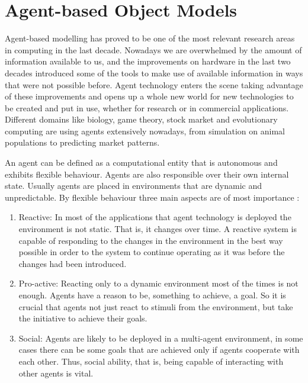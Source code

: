 \section{Agent-based Object Models}

Agent-based modelling has proved to be one of the most relevant research areas in computing in the last decade. Nowadays we are overwhelmed by the amount of information available to us, and the improvements on hardware in the last two decades introduced some of the tools to make use of available information in ways that were not possible before. Agent technology enters the scene taking advantage of these improvements and opens up a whole new world for new technologies to be created and put in use, whether for research or in  commercial applications. Different domains like biology, game theory, stock market and evolutionary computing are using agents extensively nowadays, from simulation on animal populations \cite{Caplat2008491} to predicting market patterns. \cite{andreoni1995}

An agent can be defined as a computational entity that is autonomous and exhibits flexible behaviour. Agents are also responsible over their own internal state. Usually agents are placed in environments that are dynamic and unpredictable. By flexible behaviour three main aspects are of most importance \cite{wooldridge2009introduction} :

\begin{enumerate}
\item Reactive: In most of the applications that agent technology is deployed the environment is not static. That is, it changes over time. A reactive system is capable of responding to the changes in the environment in the best way possible in order to the system to continue operating as it was before the changes had been introduced. 

\item Pro-active: Reacting only to a dynamic environment most of the times is not enough. Agents have a reason to be, something to achieve, a goal. So it is crucial that agents not just react to stimuli from the environment, but take the initiative to achieve their goals.

\item Social: Agents are likely to be deployed in a multi-agent environment, in some cases there can be some goals that are achieved only if agents cooperate with each other. Thus, social ability, that is, being capable of interacting with other agents is vital.
\end{enumerate}

